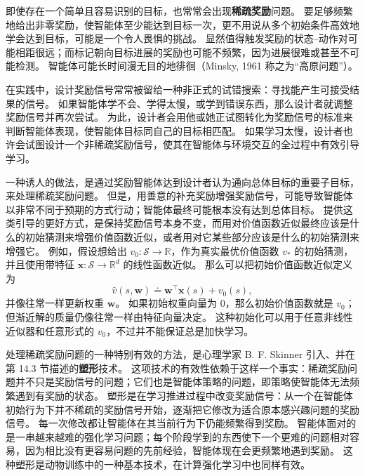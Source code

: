 \documentclass[UTF8,12pt,a4paper,fontset=fandol]{ctexart}
\begin{document}
即使存在一个简单且容易识别的目标，也常常会出现\textbf{稀疏奖励}问题。
要足够频繁地给出非零奖励，使智能体至少能达到目标一次，更不用说从多个初始条件高效地学会达到目标，可能是一个令人畏惧的挑战。
显然值得触发奖励的状态--动作对可能相距很远；而标记朝向目标进展的奖励也可能不频繁，因为进展很难或甚至不可能检测。
智能体可能长时间漫无目的地徘徊（Minsky, 1961 称之为“高原问题”）。

在实践中，设计奖励信号常常被留给一种非正式的试错搜索：寻找能产生可接受结果的信号。
如果智能体学不会、学得太慢，或学到错误东西，那么设计者就调整奖励信号并再次尝试。
为此，设计者会用他或她正试图转化为奖励信号的标准来判断智能体表现，使智能体目标同自己的目标相匹配。
如果学习太慢，设计者也许会试图设计一个非稀疏奖励信号，使其在智能体与环境交互的全过程中有效引导学习。

一种诱人的做法，是通过奖励智能体达到设计者认为通向总体目标的重要子目标，来处理稀疏奖励问题。
但是，用善意的补充奖励增强奖励信号，可能导致智能体以非常不同于预期的方式行动；智能体最终可能根本没有达到总体目标。
提供这类引导的更好方式，是保持奖励信号本身不变，而用对价值函数近似最终应该是什么的初始猜测来增强价值函数近似，或者用对它某些部分应该是什么的初始猜测来增强它。
例如，假设想给出 $v_0:\mathcal{S}\to\mathbb{R}$，作为真实最优价值函数 $v_*$ 的初始猜测，并且使用带特征 $\mathbf{x}:\mathcal{S}\to\mathbb{R}^d$ 的线性函数近似。
那么可以把初始价值函数近似定义为
\begin{equation}
\hat v(s,\mathbf{w})\doteq \mathbf{w}^\top\mathbf{x}(s)+v_0(s),
\tag{17.10}
\end{equation}
并像往常一样更新权重 $\mathbf{w}$。
如果初始权重向量为 $0$，那么初始价值函数就是 $v_0$；但渐近解的质量仍像往常一样由特征向量决定。
这种初始化可以用于任意非线性近似器和任意形式的 $v_0$，不过并不能保证总是加快学习。

处理稀疏奖励问题的一种特别有效的方法，是心理学家 B. F. Skinner 引入、并在第 14.3 节描述的\textbf{塑形}技术。
这项技术的有效性依赖于这样一个事实：稀疏奖励问题并不只是奖励信号的问题；它们也是智能体策略的问题，即策略使智能体无法频繁遇到有奖励的状态。
塑形是在学习推进过程中改变奖励信号：从一个在智能体初始行为下并不稀疏的奖励信号开始，逐渐把它修改为适合原本感兴趣问题的奖励信号。
每一次修改都让智能体在其当前行为下仍能频繁得到奖励。
智能体面对的是一串越来越难的强化学习问题；每个阶段学到的东西使下一个更难的问题相对容易，因为相比没有更容易问题的先前经验，智能体现在会更频繁地遇到奖励。
这种塑形是动物训练中的一种基本技术，在计算强化学习中也同样有效。
\end{document}
